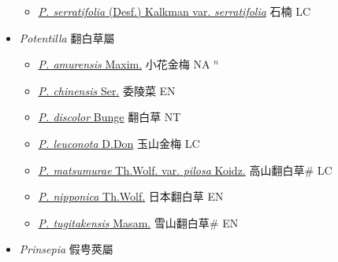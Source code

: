 \begin{itemize}
\begin{itemize}
        \item[] \href{http://www.theplantlist.org/tpl1.1/search?q=Photinia+serratifolia+var.+serratifolia}{\textit{P. serratifolia} (Desf.) Kalkman var. \textit{serratifolia}}   石楠 LC
  \end{itemize}
 \item[] \textit{Potentilla} 翻白草屬
                    
  \begin{itemize}
        \item[] \href{http://www.theplantlist.org/tpl1.1/search?q=Potentilla+amurensis}{\textit{P. amurensis} Maxim.}   小花金梅 NA $^n$
        \item[] \href{http://www.theplantlist.org/tpl1.1/search?q=Potentilla+chinensis}{\textit{P. chinensis} Ser.}   委陵菜 EN
        \item[] \href{http://www.theplantlist.org/tpl1.1/search?q=Potentilla+discolor}{\textit{P. discolor} Bunge}   翻白草 NT
        \item[] \href{http://www.theplantlist.org/tpl1.1/search?q=Potentilla+leuconota}{\textit{P. leuconota} D.Don}   玉山金梅 LC
        \item[] \href{http://www.theplantlist.org/tpl1.1/search?q=Potentilla+matsumurae+var.+pilosa}{\textit{P. matsumurae} Th.Wolf. var. \textit{pilosa} Koidz.}   高山翻白草\# LC
        \item[] \href{http://www.theplantlist.org/tpl1.1/search?q=Potentilla+nipponica}{\textit{P. nipponica} Th.Wolf.}   日本翻白草 EN
        \item[] \href{http://www.theplantlist.org/tpl1.1/search?q=Potentilla+tugitakensis}{\textit{P. tugitakensis} Masam.}   雪山翻白草\# EN
  \end{itemize}
 \item[] \textit{Prinsepia} 假甹莢屬
                    

\end{itemize}
